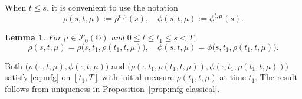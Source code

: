 \documentclass[10pt]{article}
\newtheorem{lemma}[theorem]{Lemma}
\numberwithin{equation}{section}
\newcommand{\cP}{ \mathcal{P}}
\newcommand{\bR}{\mathbb R}
\def\G{\mathbb{G}}
\begin{document}
%
%
 When $t\leq s$, it is convenient to use the notation 
\begin{equation}\label{eq:defn-rho-v}
\rho(s, t, \mu):=\rho^{t, \mu}(s), \quad \phi(s, t, \mu):=\phi^{t, \mu}(s).
\end{equation}
%
%
\begin{lemma}\label{lem:jan24.2026.6} For $\mu \in \cP_0(\G)$ and $0\leq t \leq t_1 \leq s < T$,
\[
\rho(s, t, \mu)=\rho\big(s, t_1, \rho(t_1, t, \mu)\big), \quad  \phi(s, t, \mu)=\phi\big(s, t_1, \rho(t_1, t, \mu)\big).
\]
\end{lemma}
%
\proof{} Both $\big(\rho(\cdot, t, \mu), \phi(\cdot, t, \mu)\big)$ and $\big(\rho(\cdot, t_1, \rho(t_1, t, \mu)), \phi(\cdot, t_1, \rho(t_1, t, \mu))\big)$ satisfy \eqref{eq:mfg} on $[t_1, T]$ with initial measure $\rho(t_1, t, \mu)$ at time $t_1$. The result follows from uniqueness in Proposition~\ref{prop:mfg-classical}. \endproof
\end{document}
